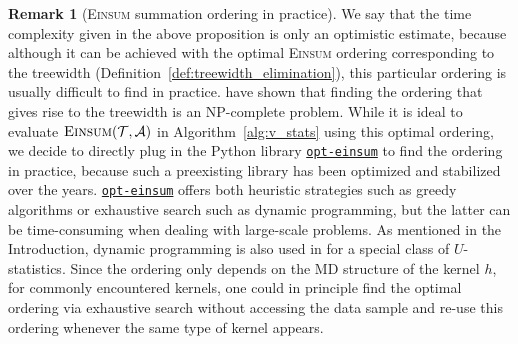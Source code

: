 \documentclass[sn-mathphys, natbib=false]{sn-jnl}
\newcommand{\libref}[2]{\href{#2}{\texttt{#1}}}
\def\package{\libref{u-stats}{https://github.com/zrq1706/U-Statistics-Python}}
\theoremstyle{plain}
\theoremstyle{definition}
\newtheorem{remark}{Remark}
\def\Einsum{\textsc{Einsum}}
\newcommand{\tensorcontraction}{\textsc{Einsum}}
\def\package{\libref{u-stats}{https://github.com/zrq1706/U-Statistics-Python}}
\newcommand{\opteinsum}{\libref{opt-einsum}{https://dgasmith.github.io/opt_einsum/}}
\def\calA{\mathcal{A}}
\def\calT{\mathcal{T}}
\begin{document}
\begin{bibunit}[agsm]
\begin{remark}[\Einsum{} summation ordering in practice]
\label{rem:ordering}
We say that the time complexity given in the above proposition is only an optimistic estimate, because although it can be achieved with the optimal \Einsum{} ordering corresponding to the treewidth (Definition~\ref{def:treewidth_elimination}), this particular ordering is usually difficult to find in practice. \citet{arnborg1987complexity} have shown that finding the ordering that gives rise to the treewidth is an NP-complete problem. While it is ideal to evaluate $\tensorcontraction(\calT, \calA)$ in Algorithm~\ref{alg:v_stats} using this optimal ordering, we decide to directly plug in the Python library \opteinsum{} \citep{daniel2018opt} to find the ordering in practice, because such a preexisting library has been optimized and stabilized over the years. \opteinsum{} offers both heuristic strategies such as greedy algorithms or exhaustive search such as dynamic programming, but the latter can be time-consuming when dealing with large-scale problems. As mentioned in the Introduction, dynamic programming is also used in \citet{zhang2025adaptive} for a special class of $U$-statistics. Since the ordering only depends on the MD structure of the kernel $h$, for commonly encountered kernels, one could in principle find the optimal ordering via exhaustive search without accessing the data sample and re-use this ordering whenever the same type of kernel appears. %


\end{remark}


\end{bibunit}
\end{document}
